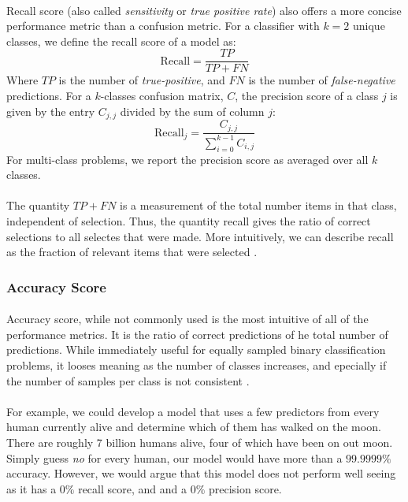 \documentclass[12pt,letterpaper]{article}
\begin{document}
\paragraph*{}Recall score (also called \textit{sensitivity} or \textit{true positive rate}) also offers a more concise performance metric than a confusion metric. For a classifier with $k = 2$ unique classes, we define the recall score of a model as:
\begin{equation}
\label{eqn-BinaryRecall}
\text{Recall} = \frac{TP}{TP + FN}
\end{equation}
Where $TP$ is the number of \textit{true-positive}, and $FN$ is the number of \textit{false-negative} predictions. For a $k$-classes confusion matrix, $C$, the precision score of a class $j$ is given by the entry $C_{j,j}$ divided by the sum of column $j$:
\begin{equation}
\label{eqn-KRecall}
\text{Recall}_j = \frac{C_{j,j}}{\sum_{i=0}^{k-1}C_{i,j}}
\end{equation}
For multi-class problems, we report the precision score as averaged over all $k$ classes.

\paragraph*{}The quantity $TP + FN$ is a measurement of the total number items in that class, independent of selection. Thus, the quantity recall gives the ratio of correct selections to all selectes that were made. More intuitively, we can describe recall as the fraction of relevant items that were selected \cite{Geron}. 


\subsubsection{Accuracy Score}

\paragraph*{}Accuracy score, while not commonly used is the most intuitive of all of the performance metrics. It is the ratio of correct predictions of he total number of predictions. While immediately useful for equally sampled binary classification problems, it looses meaning as the number of classes increases, and epecially if the number of samples per class is not consistent \cite{Geron,James}.

\paragraph*{}For example, we could develop a model that uses a few predictors from every human currently alive and determine which of them has walked on the moon. There are roughly 7 billion humans alive, four of which have been on out moon. Simply guess \textit{no} for every human, our model would have more than a $99.9999\%$ accuracy. However, we would argue that this model does not perform well seeing as it has a $0 \%$ recall score, and and a $0 \%$ precision score.
\end{document}
